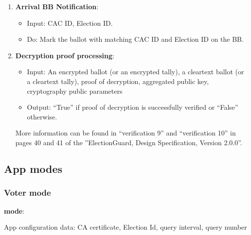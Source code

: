 \documentclass{article}
\begin{document}
\begin{enumerate}
\begin{itemize}
\begin{itemize}
    \end{itemize}
\end{itemize}
\label{Valid Vote Arrival}
    \item \textbf{Arrival BB Notification}:
\begin{itemize}
    \item Input: CAC ID, Election ID.
    \item Do: Mark the ballot with matching CAC ID and Election ID on the BB.

\end{itemize}
\label{BB Notification of Valid Vote Arrival}
\item \textbf{Decryption proof processing}:
\begin{itemize}
    \item Input: An encrypted ballot  (or an encrypted tally), a cleartext ballot (or a cleartext tally), proof of decryption, aggregated public key, cryptography public parameters
    \item Output: ``True'' if proof of decryption is successfully verified or ``False'' otherwise.
\end{itemize}
More information can be found in ``verification 9'' and ``verification 10'' in pages 40 and 41 of the ''ElectionGuard, Design Specification,
Version 2.0.0''.
\label{Decryption proof processing}
\end{enumerate}

    

\subsection{App modes}
\subsubsection{Voter mode}

\textbf{\BBInclusionCheck{} mode}:


App configuration data: CA certificate, Election Id, query interval, query number
\end{document}
